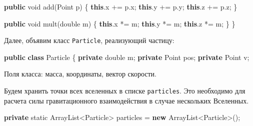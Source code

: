 \documentclass[
  12pt,
  a4paper,
]{article}
\newenvironment{Shaded}{}{}
\newcommand{\BuiltInTok}[1]{#1}
\newcommand{\DataTypeTok}[1]{\textcolor[rgb]{0.56,0.13,0.00}{#1}}
\newcommand{\FunctionTok}[1]{\textcolor[rgb]{0.02,0.16,0.49}{#1}}
\newcommand{\KeywordTok}[1]{\textcolor[rgb]{0.00,0.44,0.13}{\textbf{#1}}}
\newcommand{\NormalTok}[1]{#1}
\newcommand{\OperatorTok}[1]{\textcolor[rgb]{0.40,0.40,0.40}{#1}}
\begin{document}
\begin{Shaded}
\begin{Highlighting}[]
    \KeywordTok{public} \DataTypeTok{void} \FunctionTok{add}\OperatorTok{(}\BuiltInTok{Point}\NormalTok{ p}\OperatorTok{)} \OperatorTok{\{}
        \KeywordTok{this}\OperatorTok{.}\FunctionTok{x} \OperatorTok{+=}\NormalTok{ p}\OperatorTok{.}\FunctionTok{x}\OperatorTok{;}
        \KeywordTok{this}\OperatorTok{.}\FunctionTok{y} \OperatorTok{+=}\NormalTok{ p}\OperatorTok{.}\FunctionTok{y}\OperatorTok{;}
        \KeywordTok{this}\OperatorTok{.}\FunctionTok{z} \OperatorTok{+=}\NormalTok{ p}\OperatorTok{.}\FunctionTok{z}\OperatorTok{;}
    \OperatorTok{\}}

    \KeywordTok{public} \DataTypeTok{void} \FunctionTok{mult}\OperatorTok{(}\DataTypeTok{double}\NormalTok{ m}\OperatorTok{)} \OperatorTok{\{}
        \KeywordTok{this}\OperatorTok{.}\FunctionTok{x} \OperatorTok{*=}\NormalTok{ m}\OperatorTok{;}
        \KeywordTok{this}\OperatorTok{.}\FunctionTok{y} \OperatorTok{*=}\NormalTok{ m}\OperatorTok{;}
        \KeywordTok{this}\OperatorTok{.}\FunctionTok{z} \OperatorTok{*=}\NormalTok{ m}\OperatorTok{;}
    \OperatorTok{\}}
\OperatorTok{\}}
\end{Highlighting}
\end{Shaded}

Далее, объявим класс \texttt{Particle}, реализующий частицу:

\begin{Shaded}
\begin{Highlighting}[]
\KeywordTok{public} \KeywordTok{class}\NormalTok{ Particle }\OperatorTok{\{}
    \KeywordTok{private} \DataTypeTok{double}\NormalTok{ m}\OperatorTok{;}
    \KeywordTok{private} \BuiltInTok{Point}\NormalTok{ pos}\OperatorTok{;}
    \KeywordTok{private} \BuiltInTok{Point}\NormalTok{ v}\OperatorTok{;}
\end{Highlighting}
\end{Shaded}

Поля класса: масса, координаты, вектор скорости.

Будем хранить точки всех вселенных в списке \texttt{particles}. Это
необходимо для расчета силы гравитационного взаимодействия в случае
нескольких Вселенных.

\begin{Shaded}
\begin{Highlighting}[]
\KeywordTok{private} \DataTypeTok{static} \BuiltInTok{ArrayList}\OperatorTok{\textless{}}\NormalTok{Particle}\OperatorTok{\textgreater{}}\NormalTok{ particles }\OperatorTok{=} \KeywordTok{new} \BuiltInTok{ArrayList}\OperatorTok{\textless{}}\NormalTok{Particle}\OperatorTok{\textgreater{}();}
\end{Highlighting}
\end{Shaded}
\end{document}
